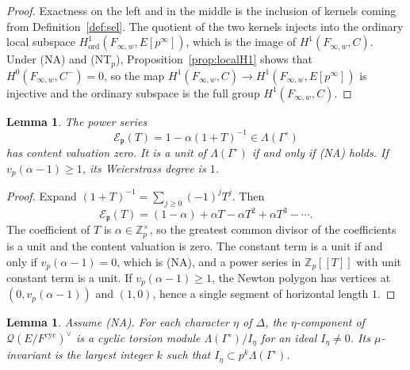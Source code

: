 \documentclass[11pt]{article}
\newtheorem{lemma}[theorem]{Lemma}
\theoremstyle{definition}
\theoremstyle{remark}
\newcommand{\Z}{\mathbb{Z}}
\newcommand{\cyc}{\mathrm{cyc}}
\newcommand{\pp}{\mathfrak{p}}
\newcommand{\cE}{\mathcal{E}}
\newcommand{\cQ}{\mathcal{Q}}
\newcommand{\Lam}{\Lambda}
\newcommand{\Gam}{\Gamma^{\circ}}
\begin{document}
\begin{proof}
Exactness on the left and in the middle is the inclusion of kernels coming from Definition~\ref{def:sel}. The quotient of the two kernels injects into the ordinary local subspace \(H^1_{\mathrm{ord}}(F_{\infty,w},E[p^\infty])\), which is the image of \(H^1(F_{\infty,w},C)\). Under (NA) and (NT\(_p\)), Proposition~\ref{prop:localH1} shows that \(H^0(F_{\infty,w},C^-)=0\), so the map \(H^1(F_{\infty,w},C)\to H^1(F_{\infty,w},E[p^\infty])\) is injective and the ordinary subspace is the full group \(H^1(F_{\infty,w},C)\).
\end{proof}

\begin{lemma}
\label{lem:euler}
The power series
\begin{equation}
\label{eq:euler}
\cE_{\pp}(T)
=
1-\alpha(1+T)^{-1}
\in\Lam(\Gam)
\end{equation}
has content valuation zero. It is a unit of \(\Lam(\Gam)\) if and only if \textup{(NA)} holds. If \(v_p(\alpha-1)\ge 1\), its Weierstrass degree is \(1\).
\end{lemma}

\begin{proof}
Expand \((1+T)^{-1}=\sum_{j\ge 0}(-1)^j T^j\). Then
\[
\cE_{\pp}(T)
=
(1-\alpha)+\alpha T-\alpha T^2+\alpha T^3-\cdots.
\]
The coefficient of \(T\) is \(\alpha\in\Z_p^\times\), so the greatest common divisor of the coefficients is a unit and the content valuation is zero. The constant term is a unit if and only if \(v_p(\alpha-1)=0\), which is (NA), and a power series in \(\Z_p[[T]]\) with unit constant term is a unit. If \(v_p(\alpha-1)\ge 1\), the Newton polygon has vertices at \((0,v_p(\alpha-1))\) and \((1,0)\), hence a single segment of horizontal length \(1\).
\end{proof}

\begin{lemma}
\label{lem:cyclic}
Assume \textup{(NA)}. For each character \(\eta\) of \(\Delta\), the \(\eta\)-component of \(\cQ(E/F^{\cyc})^\vee\) is a cyclic torsion module \(\Lam(\Gam)/I_\eta\) for an ideal \(I_\eta\neq 0\). Its \(\mu\)-invariant is the largest integer \(k\) such that \(I_\eta\subset p^k\Lam(\Gam)\).
\end{lemma}
\end{document}

